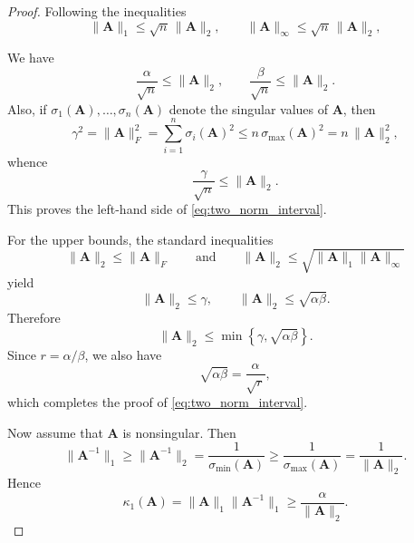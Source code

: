 \documentclass[11pt,a4paper]{article}
\theoremstyle{plain}
\theoremstyle{definition}
\theoremstyle{remark}
\begin{document}
\begin{proof}
Following the inequalities
\begin{equation*}
\|\mathbf{A}\|_1\le \sqrt{n}\,\|\mathbf{A}\|_2,
\qquad
\|\mathbf{A}\|_\infty\le \sqrt{n}\,\|\mathbf{A}\|_2,
\end{equation*}

We have
\begin{equation*}
\frac{\alpha}{\sqrt{n}}\le \|\mathbf{A}\|_2,
\qquad
\frac{\beta}{\sqrt{n}}\le \|\mathbf{A}\|_2.
\end{equation*}
Also, if $\sigma_1(\mathbf{A}),\dots,\sigma_n(\mathbf{A})$ denote the singular values of $\mathbf{A}$, then
\begin{equation*}
\gamma^2
=
\|\mathbf{A}\|_F^2
=
\sum_{i=1}^n \sigma_i(\mathbf{A})^2
\le
n\,\sigma_{\max}(\mathbf{A})^2
=
n\,\|\mathbf{A}\|_2^2,
\end{equation*}
whence
\begin{equation*}
\frac{\gamma}{\sqrt{n}}\le \|\mathbf{A}\|_2.
\end{equation*}
This proves the left-hand side of \eqref{eq:two_norm_interval}.

For the upper bounds, the standard inequalities
\begin{equation*}
\|\mathbf{A}\|_2\le \|\mathbf{A}\|_F
\qquad\text{and}\qquad
\|\mathbf{A}\|_2\le \sqrt{\|\mathbf{A}\|_1\|\mathbf{A}\|_\infty}
\end{equation*}
yield
\begin{equation*}
\|\mathbf{A}\|_2\le \gamma,
\qquad
\|\mathbf{A}\|_2\le \sqrt{\alpha\beta}.
\end{equation*}
Therefore
\begin{equation*}
\|\mathbf{A}\|_2\le \min\!\left\{\gamma,\sqrt{\alpha\beta}\right\}.
\end{equation*}
Since $r=\alpha/\beta$, we also have
\begin{equation*}
\sqrt{\alpha\beta}=\frac{\alpha}{\sqrt{r}},
\end{equation*}
which completes the proof of \eqref{eq:two_norm_interval}.

Now assume that $\mathbf{A}$ is nonsingular. Then
\begin{equation*}
\|\mathbf{A}^{-1}\|_1\ge \|\mathbf{A}^{-1}\|_2
=
\frac{1}{\sigma_{\min}(\mathbf{A})}
\ge
\frac{1}{\sigma_{\max}(\mathbf{A})}
=
\frac{1}{\|\mathbf{A}\|_2}.
\end{equation*}
Hence
\begin{equation*}
\kappa_1(\mathbf{A})
=
\|\mathbf{A}\|_1\|\mathbf{A}^{-1}\|_1
\ge
\frac{\alpha}{\|\mathbf{A}\|_2}.
\end{equation*}


\end{proof}
\end{document}
